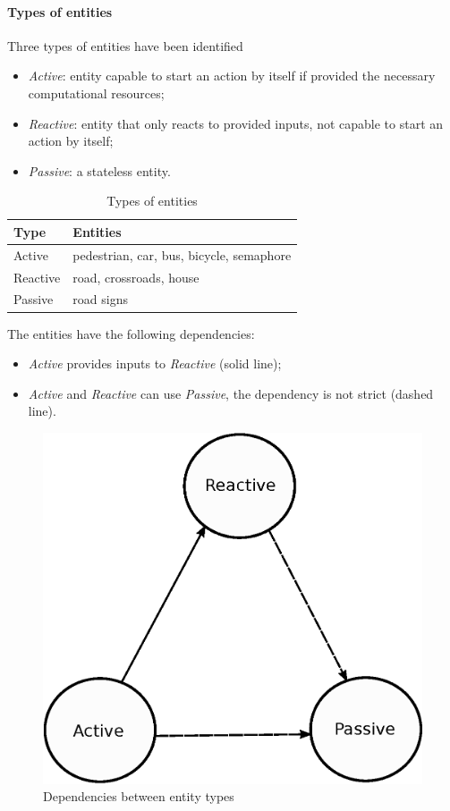 \paragraph{Types of entities}
Three types of entities have been identified
\begin{itemize}
  \item \textit{Active}: entity capable to start an action by itself if provided 
the necessary computational resources;
  \item \textit{Reactive}: entity that only reacts to provided inputs, 
not capable to start an action by itself;
  \item \textit{Passive}: a stateless entity.
\end{itemize}
\begin{table}[H]
\centering
\begin{tabular}{|l|l|}
\hline
\rowcolor{BlueGreen}
Type     & Entities                                 \\ \hline
Active   & pedestrian, car, bus, bicycle, semaphore \\ \hline
Reactive & road, crossroads, house                   \\ \hline
Passive  & road signs                               \\ \hline
\end{tabular}
\caption{Types of entities}
\label{tab:entity_type}
\end{table}
The entities have the following dependencies:
\begin{itemize}
  \item \textit{Active} provides inputs to \textit{Reactive} (solid line);
  \item \textit{Active} and \textit{Reactive} can use \textit{Passive}, the dependency is not strict (dashed line).
\end{itemize}
\begin{figure}[H]
  \centering
  \includegraphics[width=.35\columnwidth]{sections/images/solution/entity_type_dependency.eps}
  \caption{Dependencies between entity types}
  \label{fig:sd-entity-types-deps}
\end{figure}
